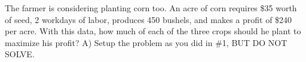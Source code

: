 \documentclass[11pt,epsfig]{article}
\begin{document}
\begin{problem}{25}
The farmer is considering planting corn too. An acre of corn requires \$35 worth of seed, 2 workdays of labor, produces 450 bushels, and makes a profit of \$240 per acre. With this data, how much of each of the three crops should he plant to maximize his profit?
\newline
A) Setup the problem as you did in \#1, BUT DO NOT SOLVE.

\vfill
\end{problem}






\showpoints
\end{document}
